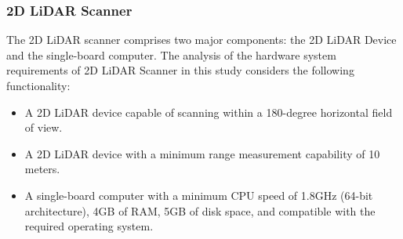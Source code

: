 \subsubsection{2D LiDAR Scanner}
The 2D LiDAR scanner comprises two major components: the 2D LiDAR Device and the single-board computer. The analysis of the hardware system requirements of 2D LiDAR Scanner in this study considers the following functionality:

\begin{itemize}
	\item A 2D LiDAR device capable of scanning within a 180-degree horizontal field of view.
	\item A 2D LiDAR device with a minimum range measurement capability of 10 meters.
	\item A single-board computer with a minimum CPU speed of 1.8GHz (64-bit architecture), 4GB of RAM, 5GB of disk space, and compatible with the required operating system.
\end{itemize}





